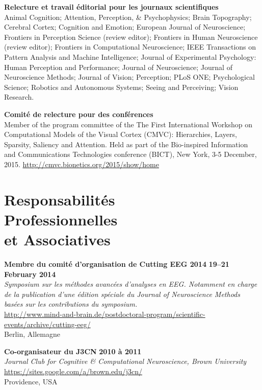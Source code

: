 \documentclass[margin,line]{resume}
\begin{document}
\begin{resume}
 \textbf{Relecture et travail éditorial pour les journaux scientifiques} \\
Animal Cognition; 
Attention, Perception, \& Psychophysics; 
Brain Topography;  
Cerebral Cortex; 
Cognition and Emotion;
European Journal of Neuroscience;
Frontiers in Perception Science (review editor); 
Frontiers in Human Neuroscience (review editor); 
Frontiers in Computational Neuroscience; 
IEEE Transactions on Pattern Analysis and Machine Intelligence;
Journal of Experimental Psychology: Human Perception and Performance;
Journal of Neuroscience;
Journal of Neuroscience Methods;
Journal of Vision;
Perception;
PLoS ONE; 
Psychological Science;
Robotics and Autonomous Systems;
Seeing and Perceiving;
Vision Research.

\textbf{Comité de relecture pour des conférences} \\
Member of the program committee of the The First International Workshop on Computational Models of the Visual Cortex (CMVC): Hierarchies, Layers, Sparsity, Saliency and Attention. Held as part of the Bio-inspired Information and Communications Technologies conference (BICT), New York, 3-5 December, 2015.
 \url{http://cmvc.bionetics.org/2015/show/home}

\vspace{3mm}
    \section{\mysidestyle Responsabilités\\ Professionnelles\\ et Associatives}

	\textbf{Membre du comité d'organisation de Cutting EEG 2014} \hfill \textbf{19--21 February 2014}\\
	\textsl{Symposium sur les méthodes avancées d'analyses en EEG. Notamment en charge de la publication d'une édition spéciale du Journal of Neuroscience Methods basées sur les contributions du symposium.}\\
	 \url{http://www.mind-and-brain.de/postdoctoral-program/scientific-events/archive/cutting-eeg/}\\
	Berlin, Allemagne
	
	\vspace{-2mm} 
	\textbf{Co-organisateur du J3CN} \hfill \textbf{2010 à 2011}\\
	\textsl{Journal Club for Cognitive \& Computational Neuroscience, Brown University}\\
	 \url{https://sites.google.com/a/brown.edu/j3cn/}\\
	Providence, USA	


\end{resume}
\end{document}
